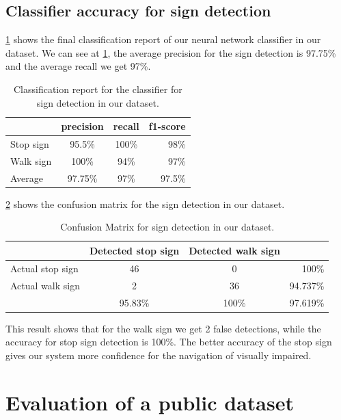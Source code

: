 \subsection{Classifier accuracy for sign detection}

\ref{t:report_walk} shows the final classification report of our neural network classifier in our dataset.
We can see at \ref{t:report_walk}, the average precision for the sign detection is 97.75\% and the average recall we get 97\%.

\begin{table}[h!]
  \centering
  \caption{Classification report for the classifier for sign detection in our dataset.}
  \label{t:report_walk}
  \begin{tabular}{  l  c  c  r }
    \rowcolor{gray!50}
     & precision & recall & f1-score \\
    \hline
    Stop sign & 95.5\% & 100\% & 98\% \\
    Walk sign & 100\% & 94\% & 97\% \\
    \hline  
    Average & 97.75\% & 97\% & 97.5\% \\
  \end{tabular}
\end{table}

\ref{t:walk_sign} shows the confusion matrix for the sign detection in our dataset.

\begin{table}[h!]
  \centering
  \caption{Confusion Matrix for sign detection in our dataset.}
  \label{t:walk_sign}
  \begin{tabular}{  l  c  c  r }
    \rowcolor{gray!50}
     & Detected stop sign & Detected walk sign &  \\
    \hline
    Actual stop sign & 46 & 0 & 100\% \\
    Actual walk sign & 2 & 36 & 94.737\% \\
    \hline
    & 95.83\% & 100\% & 97.619\% \\
    
  \end{tabular}
\end{table}

This result shows that for the walk sign we get 2 false detections, while the accuracy for stop sign detection is 100\%.
The better accuracy of the stop sign gives our system more confidence for the navigation of visually impaired. 

\section{Evaluation of a public dataset}

